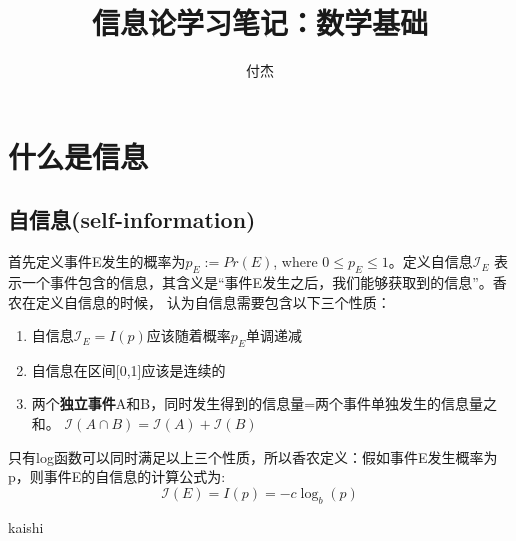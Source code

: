 \documentclass{article}
\title{信息论学习笔记：数学基础}
\author{付杰}
\begin{document}
\maketitle
\section{什么是信息}

\subsection{自信息(self-information)}
首先定义事件E发生的概率为$p_E:=Pr(E)$, where $0\leq p_E \leq 1$。定义自信息$\mathcal{I}_E$
表示一个事件包含的信息，其含义是“事件E发生之后，我们能够获取到的信息”。香农在定义自信息的时候，
认为自信息需要包含以下三个性质：
\begin{enumerate}
	\item 自信息$\mathcal{I}_E=I(p)$应该随着概率$p_E$单调递减
	\item 自信息在区间[0,1]应该是连续的
	\item 两个\textbf{独立事件}A和B，同时发生得到的信息量=两个事件单独发生的信息量之和。
	$\mathcal{I}(A \cap B)=\mathcal{I}(A)+\mathcal{I}(B)$
\end{enumerate}
只有log函数可以同时满足以上三个性质，所以香农定义：假如事件E发生概率为p，则事件E的自信息的计算公式为:
\[
	\mathcal{I}(E)=I(p)=-c\log_b(p)
\]

kaishi\cite{a1}
\end{document}
